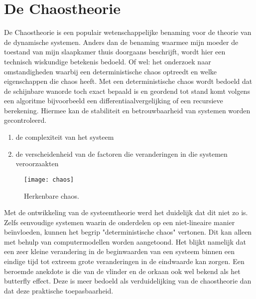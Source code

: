 \documentclass[11pt,fleqn]{book} %
\begin{document}
\section{De Chaostheorie}
De Chaostheorie is een populair wetenschappelijke benaming voor de theorie van de dynamische systemen. Anders dan de benaming waarmee mijn moeder de toestand van mijn slaapkamer thuis doorgaans beschrijft, wordt hier een technisch wiskundige betekenis bedoeld. Of wel: het onderzoek naar omstandigheden waarbij een deterministische chaos optreedt en welke eigenschappen die chaos heeft. Met een deterministische chaos wordt bedoeld dat de schijnbare wanorde toch exact bepaald is en geordend tot stand komt volgens een algoritme bijvoorbeeld een differentiaalvergelijking of een recursieve berekening. Hiermee kan de stabiliteit en betrouwbaarheid van systemen worden gecontroleerd.
\begin{enumerate}
\item de complexiteit van het systeem
\item de verscheidenheid van de factoren die veranderingen in die systemen veroorzaakten 
\end{enumerate}
\begin{figure}[h]
	\centering\texttt{[image: chaos]}
	\caption{Herkenbare chaos.}
	\label{fig:chaos}
\end{figure}
Met de ontwikkeling van de systeemtheorie werd het duidelijk dat dit niet zo is. Zelfs eenvoudige systemen waarin de onderdelen op een niet-lineaire manier beïnvloeden, kunnen het begrip "deterministische chaos" vertonen. Dit kan alleen met behulp van computermodellen worden aangetoond. Het blijkt namelijk dat een zeer kleine verandering in de beginwaarden van een systeem binnen een eindige tijd tot extreem grote veranderingen in de eindwaarde kan zorgen. Een beroemde anekdote is die van de vlinder en de orkaan ook wel bekend als het butterfly effect. Deze is meer bedoeld als verduidelijking van de chaostheorie dan dat deze praktische toepasbaarheid.
\end{document}
